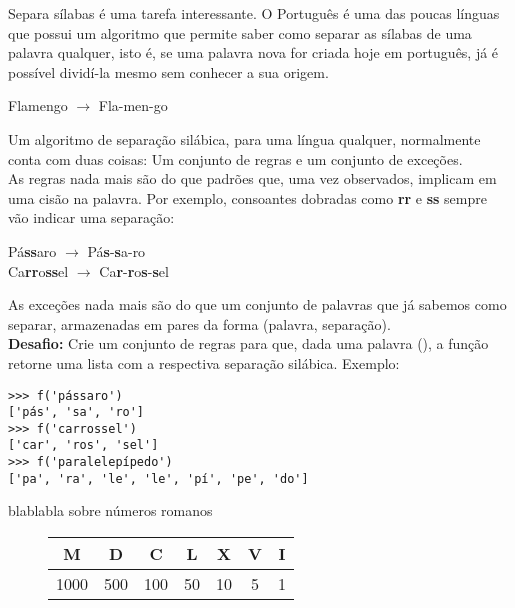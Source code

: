\documentclass[12pt]{article}
\begin{document}
	
	
	Separa sílabas é uma tarefa interessante. O Português é uma das poucas línguas que possui um algoritmo que permite saber como separar as sílabas de uma palavra qualquer, isto é, se uma palavra nova for criada hoje em português, já é possível dividí-la mesmo sem conhecer a sua origem.
	
	\begin{center}
		Flamengo $\to$ Fla-men-go
	\end{center}
	
	Um algoritmo de separação silábica, para uma língua qualquer, normalmente conta com duas coisas: Um conjunto de regras e um conjunto de exceções.\\
	
	As regras nada mais são do que padrões que, uma vez observados, implicam em uma cisão na palavra. Por exemplo, consoantes dobradas como \textbf{rr} e \textbf{ss} sempre vão indicar uma separação:
	
	\begin{center}
		Pá\textbf{ss}aro $\to$ Pá\textbf{s}-\textbf{s}a-ro\\
		Ca\textbf{rr}o\textbf{ss}el $\to$ Ca\textbf{r}-\textbf{r}o\textbf{s}-\textbf{s}el
	\end{center}
	
	As exceções nada mais são do que um conjunto de palavras que já sabemos como separar, armazenadas em pares da forma (palavra, separação).\\
	
	\textbf{Desafio:} Crie um conjunto de regras para que, dada uma palavra (), a função retorne uma lista com a respectiva separação silábica. Exemplo:
	
	\begin{lstlisting}[caption="Separando sílabas"]
>>> f('pássaro')
['pás', 'sa', 'ro']
>>> f('carrossel')
['car', 'ros', 'sel']
>>> f('paralelepípedo')
['pa', 'ra', 'le', 'le', 'pí', 'pe', 'do']
	\end{lstlisting}
	
	
	blablabla sobre números romanos\\
	
	\begin{figure}[H]
		\centering
		\begin{tabular}{|c|c|c|c|c|c|c|}
		\hline		
		M & D & C & L & X & V & I\\
		\hline
		1000 & 500 & 100 & 50 & 10 & 5 & 1\\
		\hline
		\end{tabular}
	\end{figure}
	
\end{document}
